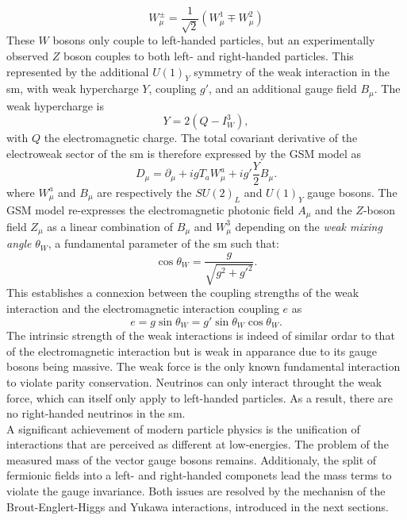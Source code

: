\begin{equation}
    W_{\mu}^{\pm} = \frac{1}{\sqrt{2}} \left(W_{\mu}^{1} \mp W_{\mu}^{2} \right)
\end{equation}
These $W$ bosons only couple to left-handed particles, but an experimentally observed $Z$ boson couples to both left- and right-handed particles. This represented by the additional $U(1)_Y$ symmetry of the weak interaction in the \gls{sm}, with weak hypercharge $Y$, coupling $g'$, and an additional gauge field $B_{\mu}$. The weak hypercharge is \[Y = 2 (Q - I_W^3),\] with $Q$ the electromagnetic charge. The total covariant derivative of the electroweak sector of the \gls{sm} is therefore expressed by the GSM model as 
\begin{equation}\label{eq-GaugeEW}
    D_{\mu}  = \partial_{\mu} + ig T_a W_{\mu}^a + ig' \frac{Y}{2} B_{\mu}. %
\end{equation}
where $W_{\mu}^a$ and $B_{\mu}$ are respectively the $SU(2)_L$ and $U(1)_Y$ gauge bosons. The GSM model re-expresses the electromagnetic photonic field $A_\mu$ and the $Z$-boson field $Z_{\mu}$ as a linear combination of $B_{\mu}$ and $W_{\mu}^3$ depending on the \textit{weak mixing angle} $\theta_W$, a fundamental parameter of the \gls{sm} such that:
\begin{equation}\label{eq-weakmixangle}
    \cos\theta_W = \frac{g}{\sqrt{g^2 +g'^2}}.
\end{equation}
This establishes a connexion between the coupling strengths of the weak interaction and the electromagnetic interaction coupling $e$ as \[e = g \sin \theta_W = g' \sin\theta_W \cos\theta_W.\] The intrinsic strength of the weak interactions is indeed of similar ordar to that of the electromagnetic interaction but is weak in apparance due to its gauge bosons being massive. The weak force is the only known fundamental interaction to violate parity conservation. Neutrinos can only interact throught the weak force, which can itself only apply to left-handed particles. As a result, there are no right-handed neutrinos in the \gls{sm}. \\

A significant achievement of modern particle physics is the unification of interactions that are perceived as different at low-energies. The problem of the measured mass of the vector gauge bosons remains. Additionaly, the split of fermionic fields into a left- and right-handed componets lead the mass terms to violate the gauge invariance. Both issues are resolved by the mechanisn of the Brout-Englert-Higgs and Yukawa interactions, introduced in the next sections.

